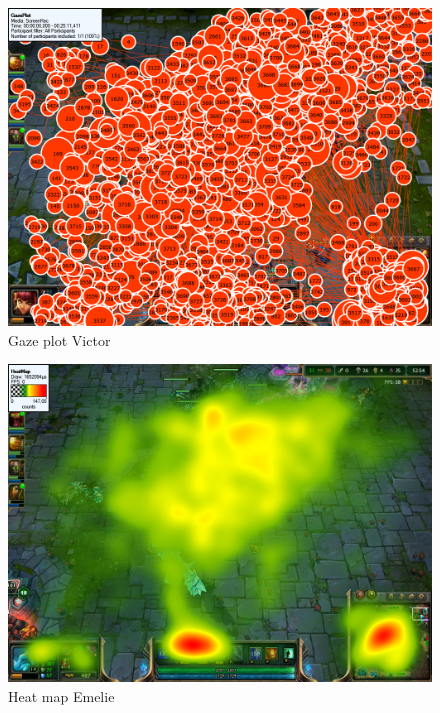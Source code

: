 \documentclass{article}
\begin{document}
\begin{figure}[h!]
\begin{center}
\includegraphics*[width=0.90\columnwidth]{images/gazeplot/Victor}
\end{center}
\caption{Gaze plot Victor}
\label{gaze_vic}
\end{figure}

\begin{figure}[h!]
\begin{center}
\includegraphics*[width=0.90\columnwidth]{images/heatmap/Emelie}
\end{center}
\caption{Heat map Emelie}
\label{heat_eme}
\end{figure}
\end{document}
